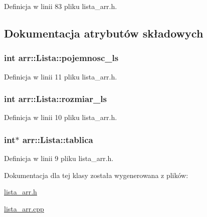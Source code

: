 Definicja w linii 83 pliku lista\-\_\-arr.\-h.



\subsection{Dokumentacja atrybutów składowych}
\hypertarget{classarr_1_1_lista_a46550171712501ae7301b95b5c35d14c}{
\subsubsection[{pojemnosc\-\_\-ls}]{\setlength{\rightskip}{0pt plus 5cm}int arr\-::\-Lista\-::pojemnosc\-\_\-ls\hspace{0.3cm}{\ttfamily [private]}}}\label{classarr_1_1_lista_a46550171712501ae7301b95b5c35d14c}


Definicja w linii 11 pliku lista\-\_\-arr.\-h.

\hypertarget{classarr_1_1_lista_a5d6712accdb4a0eda72038aadbfe1cd6}{
\subsubsection[{rozmiar\-\_\-ls}]{\setlength{\rightskip}{0pt plus 5cm}int arr\-::\-Lista\-::rozmiar\-\_\-ls\hspace{0.3cm}{\ttfamily [private]}}}\label{classarr_1_1_lista_a5d6712accdb4a0eda72038aadbfe1cd6}


Definicja w linii 10 pliku lista\-\_\-arr.\-h.

\hypertarget{classarr_1_1_lista_aba76002ee48a3dc21187f0bf9da1a746}{
\subsubsection[{tablica}]{\setlength{\rightskip}{0pt plus 5cm}int$\ast$ arr\-::\-Lista\-::tablica\hspace{0.3cm}{\ttfamily [private]}}}\label{classarr_1_1_lista_aba76002ee48a3dc21187f0bf9da1a746}


Definicja w linii 9 pliku lista\-\_\-arr.\-h.



Dokumentacja dla tej klasy została wygenerowana z plików\-:\begin{DoxyCompactItemize}
\item 
\hyperlink{lista__arr_8h}{lista\-\_\-arr.\-h}\item 
\hyperlink{lista__arr_8cpp}{lista\-\_\-arr.\-cpp}\end{DoxyCompactItemize}
